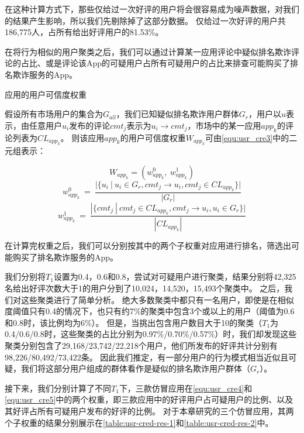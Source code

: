 在这种计算方式下，那些仅给过一次好评的用户将会很容易成为噪声数据，对我们的结果产生影响，所以我们先剔除掉了这部分数据。
仅给过一次好评的用户共186,775人，占所有给出好评用户的81.53\%。

在将行为相似的用户聚类之后，我们可以通过计算某一应用评论中疑似排名欺诈评论的占比、或是评论该App的可疑用户占所有可疑用户的占比来排查可能购买了排名欺诈服务的App。

\begin{Def}
	应用的用户可信度权重

	假设所有市场用户的集合为$G_{all}$，我们已知疑似排名欺诈用户群体$G_r$，用户以$u$表示，由任意用户$u_i$发布的评论$cmt_j$表示为$u_i \rightarrow cmt_j$，市场中的某一应用$app_k$的评论列表为$CL_{app_k}$。
	则该应用$app_k$的用户可信度权重$W_{app_k}$可由\autoref{equ:usr_cre3}中的二元组表示：
\end{Def}

\begin{equation}
	W_{app_k} = (w_{app_k}^0, ~w_{app_k}^1)
	\label{equ:usr_cre3}
\end{equation}
\begin{equation}
	w_{app_k}^0 ~ = ~ \frac{|\{u_i~|~u_i \in G_r, cmt_j \rightarrow u_i, cmt_j \in CL_{app_k}\}|}{|G_r|}
	\label{equ:usr_cre4}
\end{equation}
\begin{equation}
	w_{app_k}^1 ~ = ~ \frac{|\{cmt_j~|~cmt_j \in CL_{app_k}, cmt_j \rightarrow u_i, u_i \in G_r\}|}{|CL_{app_k}|}
	\label{equ:usr_cre5}
\end{equation}
\vspace{0.5mm}

在计算完权重之后，我们可以分别按其中的两个子权重对应用进行排名，筛选出可能购买了排名欺诈服务的App。

我们分别将$T_1$设置为0.4，0.6和0.8，尝试对可疑用户进行聚类，结果分别将42,325名给出好评次数大于1的用户分到了10,024，14,520，15,493个聚类中。
之后，我们对这些聚类进行了简单分析。
绝大多数聚类中都只有一名用户，即使是在相似度阈值只有0.4的情况下，也只有约7\%的聚类中包含3个或以上的用户（阈值为0.6和0.8时，该比例均为6\%）。
但是，当挑出包含用户数目大于10的聚类（$T_1$为0.4/0.6/0.8时，这些聚类的占比分别为0.97\%/0.70\%/0.57\%）时，我们却发现这些聚类分别包含了29,168/23,742/22,218个用户，他们所发布的好评共计分别有98,226/80,492/73,422条。
因此我们推定，有一部分用户的行为模式相当近似且可疑，我们将这部分用户组成的群体看作是疑似的排名欺诈用户群体（$G_r$）。

接下来，我们分别计算了不同$T_1$下，三款仿冒应用在\autoref{equ:usr_cre4}和\autoref{equ:usr_cre5}中的两个权重，即三款应用中的好评用户占可疑用户的比例、以及其好评占所有可疑用户发布的好评的比例。
对于本章研究的三个仿冒应用，其两个子权重的结果分别展示在\autoref{table:usr-cred-res-1}和\autoref{table:usr-cred-res-2}中。


